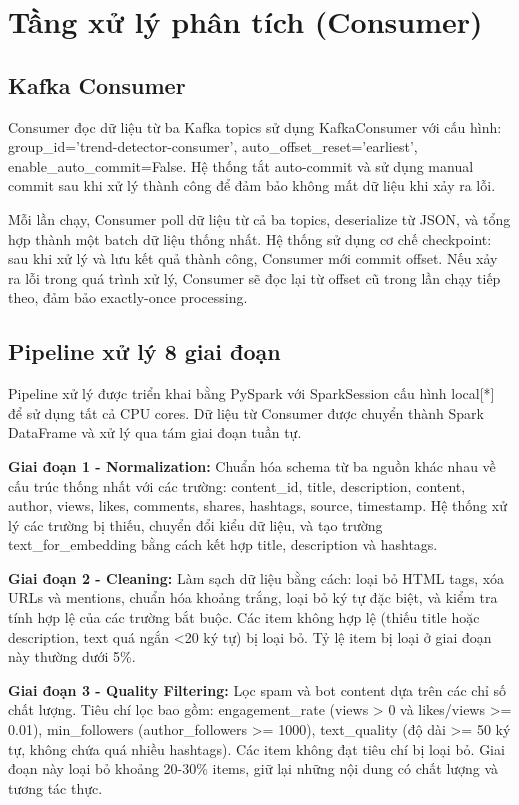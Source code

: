 \section{Tầng xử lý phân tích (Consumer)}

\subsection{Kafka Consumer}

Consumer đọc dữ liệu từ ba Kafka topics sử dụng KafkaConsumer với cấu hình: group\_id='trend-detector-consumer', auto\_offset\_reset='earliest', enable\_auto\_commit=False. Hệ thống tắt auto-commit và sử dụng manual commit sau khi xử lý thành công để đảm bảo không mất dữ liệu khi xảy ra lỗi.

Mỗi lần chạy, Consumer poll dữ liệu từ cả ba topics, deserialize từ JSON, và tổng hợp thành một batch dữ liệu thống nhất. Hệ thống sử dụng cơ chế checkpoint: sau khi xử lý và lưu kết quả thành công, Consumer mới commit offset. Nếu xảy ra lỗi trong quá trình xử lý, Consumer sẽ đọc lại từ offset cũ trong lần chạy tiếp theo, đảm bảo exactly-once processing.

\subsection{Pipeline xử lý 8 giai đoạn}

Pipeline xử lý được triển khai bằng PySpark với SparkSession cấu hình local[*] để sử dụng tất cả CPU cores. Dữ liệu từ Consumer được chuyển thành Spark DataFrame và xử lý qua tám giai đoạn tuần tự.

\textbf{Giai đoạn 1 - Normalization:} Chuẩn hóa schema từ ba nguồn khác nhau về cấu trúc thống nhất với các trường: content\_id, title, description, content, author, views, likes, comments, shares, hashtags, source, timestamp. Hệ thống xử lý các trường bị thiếu, chuyển đổi kiểu dữ liệu, và tạo trường text\_for\_embedding bằng cách kết hợp title, description và hashtags.

\textbf{Giai đoạn 2 - Cleaning:} Làm sạch dữ liệu bằng cách: loại bỏ HTML tags, xóa URLs và mentions, chuẩn hóa khoảng trắng, loại bỏ ký tự đặc biệt, và kiểm tra tính hợp lệ của các trường bắt buộc. Các item không hợp lệ (thiếu title hoặc description, text quá ngắn <20 ký tự) bị loại bỏ. Tỷ lệ item bị loại ở giai đoạn này thường dưới 5\%.

\textbf{Giai đoạn 3 - Quality Filtering:} Lọc spam và bot content dựa trên các chỉ số chất lượng. Tiêu chí lọc bao gồm: engagement\_rate (views > 0 và likes/views >= 0.01), min\_followers (author\_followers >= 1000), text\_quality (độ dài >= 50 ký tự, không chứa quá nhiều hashtags). Các item không đạt tiêu chí bị loại bỏ. Giai đoạn này loại bỏ khoảng 20-30\% items, giữ lại những nội dung có chất lượng và tương tác thực.

